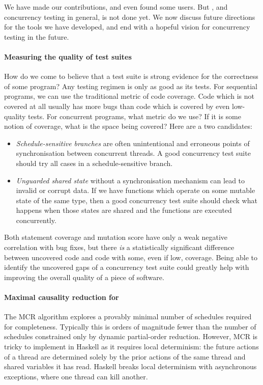 We have made our contributions, and even found some users.  But
\dejafu{}, and concurrency testing in general, is not done yet.  We
now discuss future directions for the tools we have developed, and end
with a hopeful vision for concurrency testing in the future.

\paragraph{Measuring the quality of test suites}
How do we come to believe that a test suite is strong evidence for the
correctness of some program?  Any testing regimen is only as good as
its tests.  For sequential programs, we can use the traditional metric
of code coverage.  Code which is not covered at all usually has more
bugs than code which is covered by even low-quality
tests\cite{ahmed2016}.  For concurrent programs, what metric do we
use?  If it is some notion of coverage, what is the space being
covered?  Here are a two candidates:

\begin{itemize}
\item \emph{Schedule-sensitive branches} are often unintentional and
  erroneous points of synchronisation between concurrent
  threads\cite{huang2015ssb}.  A good concurrency test suite should
  try all cases in a schedule-sensitive branch.

\item \emph{Unguarded shared state} without a synchronisation
  mechanism can lead to invalid or corrupt data.  If we have functions
  which operate on some mutable state of the same type, then a good
  concurrency test suite should check what happens when those states
  are shared and the functions are executed concurrently.
\end{itemize}

Both statement coverage and mutation score have only a weak negative
correlation with bug fixes\cite{ahmed2016}, but there \emph{is} a
statistically significant difference between uncovered code and code
with some, even if low, coverage\cite{ahmed2016}.  Being able to
identify the uncovered gaps of a concurrency test suite could greatly
help with improving the overall quality of a piece of software.

\paragraph{Maximal causality reduction for \dejafu{}}
The MCR algorithm\cite{huang2015} explores a provably minimal number
of schedules required for completeness.  Typically this is orders of
magnitude fewer than the number of schedules constrained only by
dynamic partial-order reduction.  However, MCR is tricky to implement
in Haskell as it requires local determinism: the future actions of a
thread are determined solely by the prior actions of the same thread
and shared variables it has read.  Haskell breaks local determinism
with asynchronous exceptions, where one thread can kill another.

